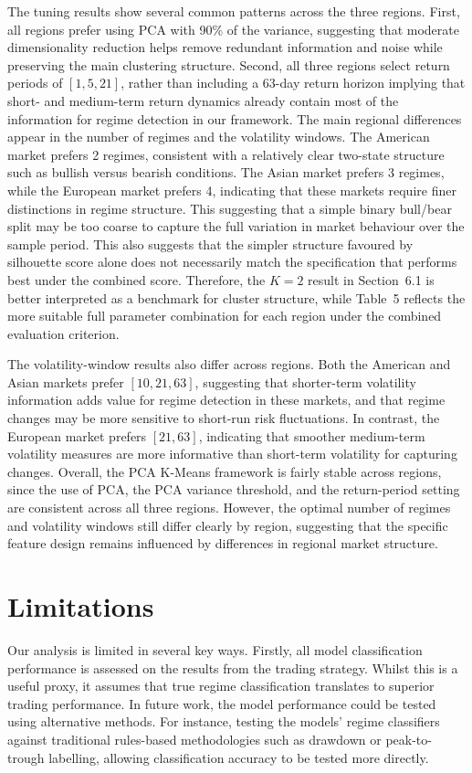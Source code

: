 \documentclass[11pt, a4paper]{article}
\begin{document}
The tuning results show several common patterns across the three regions. First, all regions prefer using PCA with 90\% of the variance, suggesting that moderate dimensionality reduction helps remove redundant information and noise while preserving the main clustering structure. 
Second, all three regions select return periods of \([1,5,21]\), rather than including a 63-day return horizon implying that short- and medium-term return dynamics already contain most of the information for regime detection in our framework.
The main regional differences appear in the number of regimes and the volatility windows. The American market prefers 2 regimes, consistent with a relatively clear two-state structure such as bullish versus bearish conditions.
The Asian market prefers 3 regimes, while the European market prefers 4, indicating that these markets require finer distinctions in regime structure. This suggesting that a simple binary bull/bear split may be too coarse to capture the full variation in market behaviour over the sample period.
This also suggests that the simpler structure favoured by silhouette score alone does not necessarily match the specification that performs best under the combined score.
Therefore, the \(K=2\) result in Section~6.1 is better interpreted as a benchmark for cluster structure, while Table~5 reflects the more suitable full parameter combination for each region under the combined evaluation criterion.

The volatility-window results also differ across regions. Both the American and Asian markets prefer \([10,21,63]\), suggesting that shorter-term volatility information adds value for regime detection in these markets, and that regime changes may be more sensitive to short-run risk fluctuations. 
In contrast, the European market prefers \([21,63]\), indicating that smoother medium-term volatility measures are more informative than short-term volatility for capturing changes. Overall, the PCA K-Means framework is fairly stable across regions, since the use of PCA, the PCA variance threshold, and the return-period setting are consistent across all three regions. 
However, the optimal number of regimes and volatility windows still differ clearly by region, suggesting that the specific feature design remains influenced by differences in regional market structure.




\section{Limitations}
Our analysis is limited in several key ways. Firstly, all model classification performance is assessed on the results from the trading strategy. Whilst this is a useful proxy, it assumes that true regime classification translates to superior trading performance. In future work, the model performance could be tested using alternative methods. For instance, testing the models' regime classifiers against traditional rules-based methodologies such as drawdown or peak-to-trough labelling, allowing classification accuracy to be tested more directly. 
\end{document}
